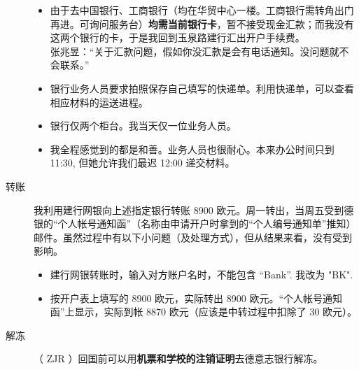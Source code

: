 \documentclass{article}
\begin{document}
\begin{description}
\begin{itemize}
\item 由于去中国银行、工商银行（均在华贸中心一楼。工商银行需转角出门再进。可询问服务台）\textbf{均需\color{blue}当前银行卡}，暂不接受现金汇款；而我没有这两个银行的卡，于是我回到玉泉路建行汇出开户手续费。%
\\
张兆昱：“关于汇款问题，假如你没汇款是会有电话通知。没问题就不会联系。”
\item 银行业务人员要求拍照保存自己填写的快递单。利用快递单，可以查看相应材料的运送进程。
\item 银行仅两个柜台。我当天仅一位业务人员。
\item 我全程感觉到的都是{\color{blue}和善}。业务人员也很耐心。本来办公时间只到 11:30, 但她允许我们最迟 12:00 递交材料。
\end{itemize}
\item[转账] 我利用建行网银向上述指定银行转账 8900 欧元。周一转出，当周五受到德银的“个人帐号通知函”（名称由申请开户时拿到的“个人编号通知单”推知）邮件。虽然过程中有以下小问题（及处理方式），但从结果来看，没有受到影响。
\begin{itemize}
  \item 建行网银转账时，输入对方账户名时，不能包含 ``Bank''. 我改为 "BK".
  \item 按开户表上填写的 8900 欧元，实际转出 8900 欧元。“个人帐号通知函”上显示，实际到帐 8870 欧元（应该是中转过程中扣除了 30 欧元）。
\end{itemize} 
\item[解冻] （ ZJR ）回国前可以用\textbf{机票和学校的注销证明}去德意志银行解冻。
\end{description}
\end{document}

